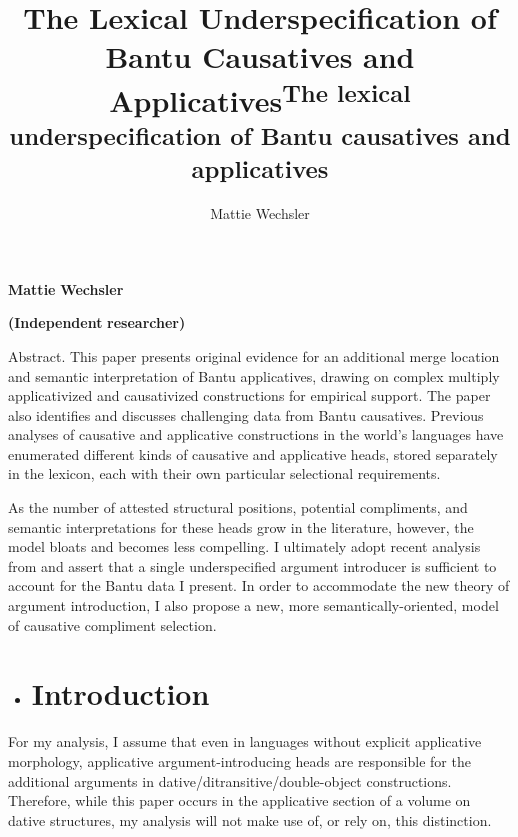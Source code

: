 \documentclass[output=paper,modfonts,nonflat]{langsci/langscibook}
\author{Mattie Wechsler\affiliation{}}
\title{The Lexical Underspecification of Bantu Causatives and Applicatives}
\begin{document}
\maketitle 

\title{\textsuperscript{The lexical underspecification of Bantu causatives and applicatives}}

\textbf{Mattie} \textbf{Wechsler}

\textbf{(Independent} \textbf{researcher)}

\begin{stylelsAbstract}
Abstract. This paper presents original evidence for an additional merge location and semantic interpretation of Bantu applicatives, drawing on complex multiply applicativized and causativized constructions for empirical support. The paper also identifies and discusses challenging data from Bantu causatives. Previous analyses of causative and applicative constructions in the world’s languages have enumerated different kinds of causative and applicative heads, stored separately in the lexicon, each with their own particular selectional requirements. 
\end{stylelsAbstract}

\begin{stylelsAbstract}
As the number of attested structural positions, potential compliments, and semantic interpretations for these heads grow in the literature, however, the model bloats and becomes less compelling. I ultimately adopt recent analysis from \citet{WoodMarantz2017} and assert that a single underspecified argument introducer is sufficient to account for the Bantu data I present.  In order to accommodate the new theory of argument introduction, I also propose a new, more semantically-oriented, model of causative compliment selection. 
\end{stylelsAbstract}

\begin{itemize}
\item \section{Introduction}
\end{itemize}

For my analysis, I assume that even in languages without explicit applicative morphology, applicative argument-introducing heads are responsible for the additional arguments in dative/ditransitive/double-object constructions. Therefore, while this paper occurs in the applicative section of a volume on dative structures, my analysis will not make use of, or rely on, this distinction. 
\end{document}
